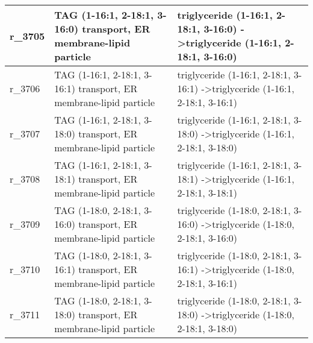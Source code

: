 \begin{landscape}
{\begin{longtable}{|l|p{7cm}|p{15cm}|}
r\_3705 & TAG (1-16:1, 2-18:1, 3-16:0) transport, ER membrane-lipid particle & triglyceride (1-16:1, 2-18:1, 3-16:0)  -\textgreater triglyceride (1-16:1, 2-18:1, 3-16:0) \\ \hline
r\_3706 & TAG (1-16:1, 2-18:1, 3-16:1) transport, ER membrane-lipid particle & triglyceride (1-16:1, 2-18:1, 3-16:1)  -\textgreater triglyceride (1-16:1, 2-18:1, 3-16:1) \\ \hline
r\_3707 & TAG (1-16:1, 2-18:1, 3-18:0) transport, ER membrane-lipid particle & triglyceride (1-16:1, 2-18:1, 3-18:0)  -\textgreater triglyceride (1-16:1, 2-18:1, 3-18:0) \\ \hline
r\_3708 & TAG (1-16:1, 2-18:1, 3-18:1) transport, ER membrane-lipid particle & triglyceride (1-16:1, 2-18:1, 3-18:1)  -\textgreater triglyceride (1-16:1, 2-18:1, 3-18:1) \\ \hline
r\_3709 & TAG (1-18:0, 2-18:1, 3-16:0) transport, ER membrane-lipid particle & triglyceride (1-18:0, 2-18:1, 3-16:0)  -\textgreater triglyceride (1-18:0, 2-18:1, 3-16:0) \\ \hline
r\_3710 & TAG (1-18:0, 2-18:1, 3-16:1) transport, ER membrane-lipid particle & triglyceride (1-18:0, 2-18:1, 3-16:1)  -\textgreater triglyceride (1-18:0, 2-18:1, 3-16:1) \\ \hline
r\_3711 & TAG (1-18:0, 2-18:1, 3-18:0) transport, ER membrane-lipid particle & triglyceride (1-18:0, 2-18:1, 3-18:0)  -\textgreater triglyceride (1-18:0, 2-18:1, 3-18:0) \\ \hline
\end{longtable}}
\end{landscape}
